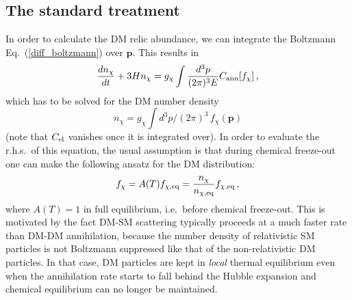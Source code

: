 \documentclass[twocolumn,showpacs,amsmath,amssymb,superscriptaddress,nofootinbib]{revtex4-1}
\newcommand{\be}{\begin{equation}}
\newcommand{\ee}{\end{equation}}
\begin{document}
\subsection{The standard treatment}
\label{sec:standard}

In order to calculate the DM relic abundance, we can integrate the Boltzmann Eq.~(\ref{diff_boltzmann}) 
over $\mathbf{p}$. This results in
\be
\label{eq:boltzsimp}
\frac{dn_\chi}{dt}+3Hn_\chi= g_\chi \int \frac{d^3p}{(2\pi)^3E} C_{\rm ann}[f_\chi]\,,
\ee
which has to be solved for the DM number density 
\be
n_\chi=g_\chi\int d^3p/(2\pi)^3\,f_\chi(\mathbf{p})
\label{eq:n}
\ee
(note that $C_{\rm el}$ vanishes once it is integrated over).
In order to evaluate the r.h.s.~of this equation, the usual assumption \cite{Gondolo:1990dk}
is that during chemical freeze-out one can make the following ansatz for the DM distribution:
\be
\label{kineq_ansatz}
f_\chi=A(T)f_{\chi,{\rm eq}}=\frac{n_\chi}{n_{\chi, {\rm eq}}} f_{\chi,{\rm eq}}\,,
\ee
where $A(T)=1$ in full equilibrium, i.e.~before chemical freeze-out. 
This is motivated by the fact DM-SM scattering typically proceeds 
at a much faster rate than DM-DM annihilation, because the number density of relativistic SM particles
is not Boltzmann suppressed like that of the non-relativistic DM particles. In that case, DM particles 
are kept in {\it local} thermal equilibrium even when the annihilation rate starts to fall behind the Hubble 
expansion and chemical equilibrium can no longer be maintained.
\end{document}
